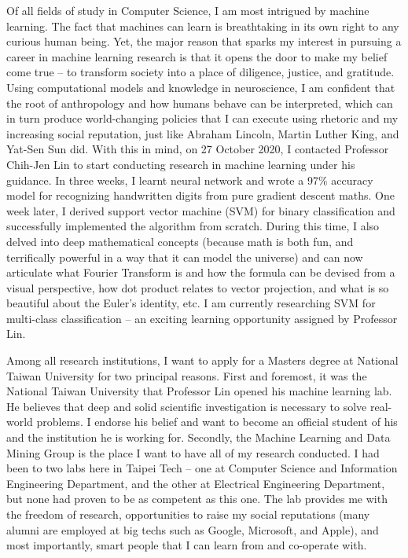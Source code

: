 \documentclass[letterpaper,12pt]{article}
\begin{document}
Of all fields of study in Computer Science, I am most intrigued by machine learning. The fact that machines can learn is breathtaking in its own right to any curious human being. Yet, the major reason that sparks my interest in pursuing a career in machine learning research is that it opens the door to make my belief come true -- to transform society into a place of diligence, justice, and gratitude. Using computational models and knowledge in neuroscience, I am confident that the root of anthropology and how humans behave can be interpreted, which can in turn produce world-changing policies that I can execute using rhetoric and my increasing social reputation, just like Abraham Lincoln, Martin Luther King, and Yat-Sen Sun did. With this in mind, on 27 October 2020, I contacted Professor Chih-Jen Lin to start conducting research in machine learning under his guidance. In three weeks, I learnt neural network and wrote a 97\% accuracy model for recognizing handwritten digits from pure gradient descent maths. One week later, I derived support vector machine (SVM) for binary classification and successfully implemented the algorithm from scratch. During this time, I also delved into deep mathematical concepts (because math is both fun, and terrifically powerful in a way that it can model the universe) and can now articulate what Fourier Transform is and how the formula can be devised from a visual perspective, how dot product relates to vector projection, and what is so beautiful about the Euler’s identity, etc. I am currently researching SVM for multi-class classification -- an exciting learning opportunity assigned by Professor Lin.

Among all research institutions, I want to apply for a Masters degree at National Taiwan University for two principal reasons. First and foremost, it was the National Taiwan University that Professor Lin opened his machine learning lab. He believes that deep and solid scientific investigation is necessary to solve real-world problems. I endorse his belief and want to become an official student of his and the institution he is working for. Secondly, the Machine Learning and Data Mining Group is the place I want to have all of my research conducted. I had been to two labs here in Taipei Tech -- one at Computer Science and Information Engineering Department, and the other at Electrical Engineering Department, but none had proven to be as competent as this one. The lab provides me with the freedom of research, opportunities to raise my social reputations (many alumni are employed at big techs such as Google, Microsoft, and Apple), and most importantly, smart people that I can learn from and co-operate with.
\end{document}
